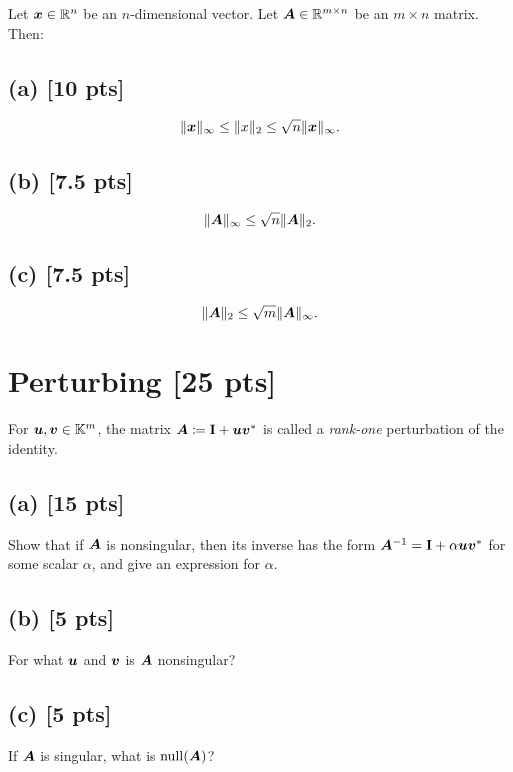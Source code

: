\documentclass[twoside,10pt]{article}
\begin{document}
Let $\bm{x} \in \mathbb{R}^n$ be an $n$-dimensional vector. Let $\bm{A} \in \mathbb{R}^{m \times n}$ be an $m \times n$ matrix. Then: 

\subsection*{(a) [10 pts]}
\begin{equation*}
  \|\bm{x}\|_{\infty} \leq \|x\|_2 \leq \sqrt{n}\|\bm{x}\|_{\infty}.
\end{equation*}

\subsection*{(b) [7.5 pts]}
\begin{equation*}
  \|\bm{A}\|_{\infty} \leq \sqrt{n}\|\bm{A}\|_2.
\end{equation*}

\subsection*{(c) [7.5 pts]}
\begin{equation*}
  \|\bm{A}\|_{2} \leq \sqrt{m}\|\bm{A}\|_{\infty}.
\end{equation*}

\section{Perturbing [25 pts]}
For $\bm{u}, \bm{v} \in \mathbb{K}^m$, the matrix $\bm{A} \coloneqq \mathbf{I} + \bm{u}\bm{v}^{*}$ is called a \emph{rank-one} perturbation of the identity. 

\subsection*{(a) [15 pts]}
Show that if $\bm{A}$ is nonsingular, then its inverse has the form $\bm{A}^{-1} = \mathbf{I} + \alpha \bm{u}\bm{v}^{*}$ for some scalar $\alpha$, and give an expression for $\alpha$.

\subsection*{(b) [5 pts]}
For what $\bm{u}$ and $\bm{v}$ is $\bm{A}$ nonsingular? 

\subsection*{(c) [5 pts]} 
If $\bm{A}$ is singular, what is $\operatorname{null}(\bm{A})$?
\end{document}
